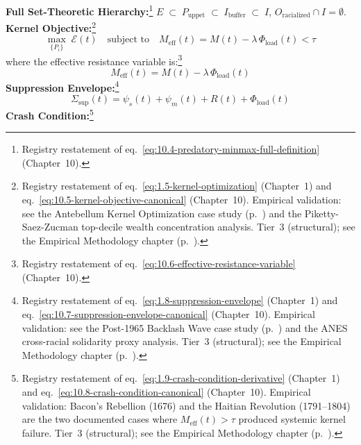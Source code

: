 \begin{definition}
\textbf{Full Set-Theoretic Hierarchy:}\footnote{Registry restatement of eq.~\eqref{eq:10.4-predatory-minmax-full-definition} (Chapter~10).} $E \;\subset\; P_{\text{uppet}} \;\subset\; I_{\text{buffer}} \;\subset\; I$, $O_{\text{racialized}} \cap I = \emptyset$.\\
\textbf{Kernel Objective:}\footnote{Registry restatement of eq.~\eqref{eq:1.5-kernel-optimization} (Chapter~1) and eq.~\eqref{eq:10.5-kernel-objective-canonical} (Chapter~10). Empirical validation: see the Antebellum Kernel Optimization case study (p.~\pageref{cs:kernel_antebellum}) and the Piketty-Saez-Zucman top-decile wealth concentration analysis. Tier~3 (structural); see the Empirical Methodology chapter (p.~\pageref{ch:empirical_methodology}).}
\begin{equation}\label{eq:19.1-kernel-objective-registry-entry}
\max_{\{P_i\}}\; \mathcal{E}(t) \quad \text{subject to} \quad M_{\text{eff}}(t) = M(t) - \lambda\,\Phi_{\text{load}}(t) < \tau
\end{equation}
where the effective resistance variable is:\footnote{Registry restatement of eq.~\eqref{eq:10.6-effective-resistance-variable} (Chapter~10).}
\begin{equation}\label{eq:19.1a-effective-resistance-registry-entry}
M_{\text{eff}}(t) = M(t) - \lambda\,\Phi_{\text{load}}(t)
\end{equation}
\textbf{Suppression Envelope:}\footnote{Registry restatement of eq.~\eqref{eq:1.8-suppression-envelope} (Chapter~1) and eq.~\eqref{eq:10.7-suppression-envelope-canonical} (Chapter~10). Empirical validation: see the Post-1965 Backlash Wave case study (p.~\pageref{cs:backlash_wave}) and the ANES cross-racial solidarity proxy analysis. Tier~3 (structural); see the Empirical Methodology chapter (p.~\pageref{ch:empirical_methodology}).}
\begin{equation}\label{eq:19.2-suppression-envelope-registry-entry}
\Sigma_{\text{sup}}(t) = \psi_s(t) + \psi_m(t) + R(t) + \Phi_{\text{load}}(t)
\end{equation}
\textbf{Crash Condition:}\footnote{Registry restatement of eq.~\eqref{eq:1.9-crash-condition-derivative} (Chapter~1) and eq.~\eqref{eq:10.8-crash-condition-canonical} (Chapter~10). Empirical validation: Bacon's Rebellion (1676) and the Haitian Revolution (1791--1804) are the two documented cases where $M_{\text{eff}}(t) > \tau$ produced systemic kernel failure. Tier~3 (structural); see the Empirical Methodology chapter (p.~\pageref{ch:empirical_methodology}).}

\end{definition}
